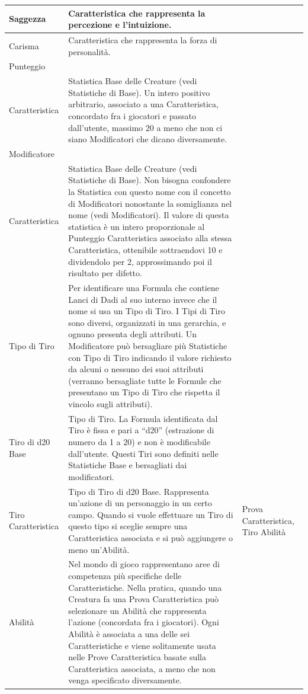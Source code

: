 \documentclass[a4paper, 11pt]{article}
\let\newline\\
\begin{document}
\begin{center}
\begin{longtable}{ |p{3.5cm}|p{9cm}|p{3cm}|  }
         Saggezza & Caratteristica che rappresenta la percezione e l'intuizione. &\\\hline
         Carisma & Caratteristica che rappresenta la forza di personalità.&\\\hline
         Punteggio \newline Caratteristica & Statistica Base delle Creature (vedi Statistiche di Base). Un intero positivo arbitrario, associato a una Caratteristica, concordato fra i giocatori e passato dall’utente, massimo 20 a meno che non ci siano Modificatori che dicano diversamente. & \\\hline
         Modificatore \newline Caratteristica & Statistica Base delle Creature (vedi Statistiche di Base). Non bisogna confondere la Statistica con questo nome con il concetto di Modificatori nonostante la somiglianza nel nome (vedi Modificatori). Il valore di questa statistica è un intero proporzionale al Punteggio Caratteristica associato alla stessa  Caratteristica, ottenibile sottraendovi 10 e dividendolo per 2, approssimando poi il risultato per difetto. & \\\hline
         Tipo di Tiro & Per identificare una Formula che contiene Lanci di Dadi al suo interno invece che il nome si usa un Tipo di Tiro. I Tipi di Tiro sono diversi, organizzati in una gerarchia, e ognuno presenta degli attributi. Un Modificatore può bersagliare più Statistiche con Tipo di Tiro indicando il valore richiesto da alcuni o nessuno dei suoi attributi (verranno bersagliate tutte le Formule che presentano un Tipo di Tiro che rispetta il vincolo sugli attributi). & \\\hline
        Tiro di d20 Base & Tipo di Tiro. La Formula identificata dal Tiro è fissa e pari a “d20” (estrazione di numero da 1 a 20) e non è modificabile dall’utente. Questi Tiri sono definiti nelle Statistiche Base e bersagliati dai modificatori. & \\\hline
        Tiro Caratteristica & Tipo di Tiro di d20 Base. Rappresenta un'azione di un personaggio in un certo campo. Quando si vuole effettuare un Tiro di questo tipo si sceglie sempre una Caratteristica associata e si può aggiungere o meno un'Abilità. & Prova Caratteristica, Tiro Abilità \\\hline
        Abilità & Nel mondo di gioco rappresentano aree di competenza più specifiche delle Caratteristiche.  Nella pratica, quando una Creatura fa una Prova Caratteristica può selezionare un Abilità che rappresenta l’azione (concordata fra i giocatori). Ogni Abilità è associata a una delle sei Caratteristiche e viene solitamente usata nelle Prove Caratteristica basate sulla Caratteristica associata, a meno che non venga specificato diversamente. & \\\hline

\end{longtable}
\end{center}
\end{document}
